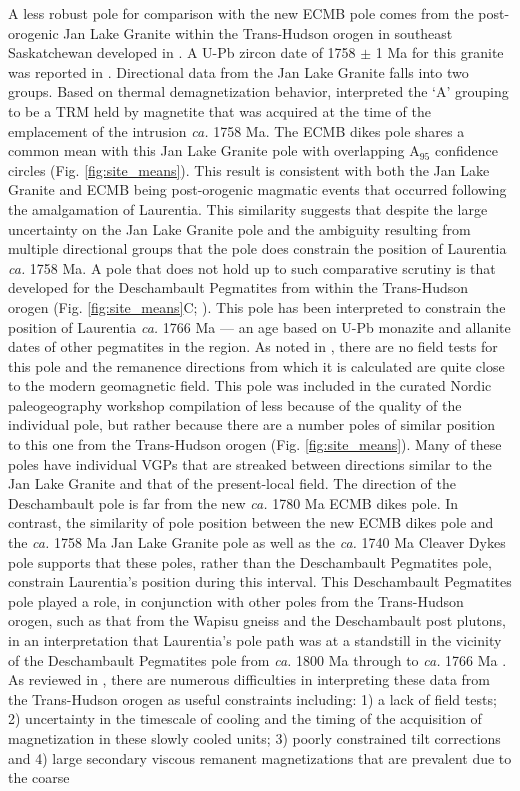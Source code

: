 \documentclass[draft]{agujournal2019}
\begin{document}
 A less robust pole for comparison with the new ECMB pole comes from the post-orogenic Jan Lake Granite within the Trans-Hudson orogen in southeast Saskatchewan developed in . A U-Pb zircon date of 1758 $\pm$ 1 Ma for this granite was reported in . Directional data from the Jan Lake Granite falls into two groups. Based on thermal demagnetization behavior,  interpreted the `A' grouping to be a TRM held by magnetite that was acquired at the time of the emplacement of the intrusion \textit{ca.} 1758 Ma.  The ECMB dikes pole shares a common mean with this Jan Lake Granite pole with overlapping A$_{95}$ confidence circles (Fig. \ref{fig:site_means}). This result is consistent with both the Jan Lake Granite and ECMB being post-orogenic magmatic events that occurred following the amalgamation of Laurentia. This similarity suggests that despite the large uncertainty on the Jan Lake Granite pole and the ambiguity resulting from multiple directional groups that the pole does constrain the position of Laurentia \textit{ca.} 1758 Ma. A pole that does not hold up to such comparative scrutiny is that developed for the Deschambault Pegmatites from within the Trans-Hudson orogen (Fig. \ref{fig:site_means}C; ).  This pole has been interpreted to constrain the position of Laurentia \textit{ca.} 1766 Ma --- an age based on U-Pb monazite and allanite dates of other pegmatites in the region. As noted in , there are no field tests for this pole and the remanence directions from which it is calculated are quite close to the modern geomagnetic field. This pole was included in the curated Nordic paleogeography workshop compilation of   less because of the quality of the individual pole, but rather because there are a number poles of similar position to this one from the Trans-Hudson orogen (Fig. \ref{fig:site_means}). Many of these poles have individual VGPs that are streaked between directions similar to the Jan Lake Granite and that of the present-local field. The direction of the Deschambault pole is far from the new \textit{ca.} 1780 Ma ECMB dikes pole. In contrast, the similarity of pole position between the new ECMB dikes pole and the \textit{ca.} 1758 Ma Jan Lake Granite pole as well as the \textit{ca.} 1740 Ma Cleaver Dykes pole supports that these poles, rather than the Deschambault Pegmatites pole, constrain Laurentia's position during this interval. This Deschambault Pegmatites pole played a role, in conjunction with other poles from the Trans-Hudson orogen, such as that from the Wapisu gneiss and the Deschambault post plutons, in an interpretation that Laurentia's pole path was at a standstill in the vicinity of the Deschambault Pegmatites pole from \textit{ca.} 1800 Ma through to \textit{ca.} 1766 Ma \cite{Symons2000a, Symons2005a}. As reviewed in , there are numerous difficulties in interpreting these data from the Trans-Hudson orogen as useful constraints including: 1) a lack of field tests; 2) uncertainty in the timescale of cooling and the timing of the acquisition of magnetization in these slowly cooled units; 3) poorly constrained tilt corrections and 4) large secondary viscous remanent magnetizations that are prevalent due to the coarse 
\end{document}
